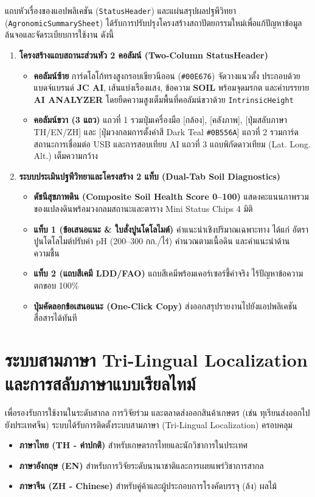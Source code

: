 แถบหัวเรื่องของแอปพลิเคชัน (\texttt{StatusHeader}) และแผ่นสรุปผลปฐพีวิทยา (\texttt{AgronomicSummarySheet}) ได้รับการปรับปรุงโครงสร้างสถาปัตยกรรมใหม่เพื่อแก้ปัญหาข้อมูลล้นจอและจัดระเบียบการใช้งาน ดังนี้
\begin{enumerate}
    \item \textbf{โครงสร้างแถบสถานะส่วนหัว 2 คอลัมน์ (Two-Column StatusHeader)}
    \begin{itemize}
        \item \textbf{คอลัมน์ซ้าย} การ์ดโลโก้ทรงสูงกรอบเขียวนีออน (\texttt{\#00E676}) จัดวางแนวตั้ง ประกอบด้วย แบดจ์แบรนด์ \textbf{JC AI}, เส้นแบ่งเรืองแสง, ข้อความ \textbf{SOIL} พร้อมจุดมรกต และคำบรรยาย \textbf{AI ANALYZER} โดยยืดความสูงเต็มพื้นที่คอลัมน์ขวาด้วย \texttt{IntrinsicHeight}
        \item \textbf{คอลัมน์ขวา (3 แถว)} แถวที่ 1 รวมปุ่มเครื่องมือ [กล้อง], [คลังภาพ], [ปุ่มสลับภาษา TH/EN/ZH] และ [ปุ่มวงกลมการตั้งค่าสี Dark Teal \texttt{\#0B556A}] แถวที่ 2 รวมการ์ดสถานะการเชื่อมต่อ USB และการสอบเทียบ AI แถวที่ 3 แถบพิกัดดาวเทียม (Lat. Long. Alt.) เต็มความกว้าง
    \end{itemize}
    \item \textbf{ระบบประเมินปฐพีวิทยาและโครงสร้าง 2 แท็บ (Dual-Tab Soil Diagnostics)}
    \begin{itemize}
        \item \textbf{ดัชนีสุขภาพดิน (Composite Soil Health Score 0--100)} แสดงคะแนนภาพรวมของแปลงดินพร้อมวงกลมสถานะและตาราง Mini Status Chips 4 มิติ
        \item \textbf{แท็บ 1 (ข้อเสนอแนะ \& ใบสั่งปูนโดโลไมต์)} คำแนะนำเชิงปริมาณเฉพาะทาง ได้แก่ อัตราปูนโดโลไมต์ปรับค่า pH (200--300 กก./ไร่) คำนวณตามเนื้อดิน และคำแนะนำด้านความชื้น
        \item \textbf{แท็บ 2 (แถบสีเคมี LDD/FAO)} แถบสีเคมีพร้อมเคอร์เซอร์ชี้ค่าจริง ไร้ปัญหาข้อความตกขอบ 100\%
        \item \textbf{ปุ่มคัดลอกข้อเสนอแนะ (One-Click Copy)} ส่งออกสรุปรายงานไปยังแอปพลิเคชันสื่อสารได้ทันที
    \end{itemize}
\end{enumerate}

\section{ระบบสามภาษา Tri-Lingual Localization และการสลับภาษาแบบเรียลไทม์}

เพื่อรองรับการใช้งานในระดับสากล การวิจัยร่วม และตลาดส่งออกสินค้าเกษตร (เช่น ทุเรียนส่งออกไปยังประเทศจีน) ระบบได้รับการติดตั้งระบบสามภาษา (Tri-Lingual Localization) ครอบคลุม
\begin{itemize}
    \item \textbf{ภาษาไทย (TH - ค่าปกติ)} สำหรับเกษตรกรไทยและนักวิชาการในประเทศ
    \item \textbf{ภาษาอังกฤษ (EN)} สำหรับการวิจัยระดับนานาชาติและการเผยแพร่วิชาการสากล
    \item \textbf{ภาษาจีน (ZH - Chinese)} สำหรับคู่ค้าและผู้ประกอบการโรงคัดบรรจุ (ล้ง) ผลไม้
\end{itemize}

